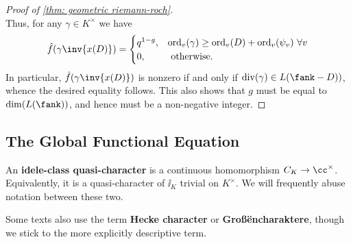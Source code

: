 \documentclass[11pt, x11names, openany]{book}
\begin{document}
\begin{proof}[Proof of \ref{thm: geometric riemann-roch}]
\begin{equation*}
\end{equation*}
Thus, for any $\gamma \in K^\times$ we have
\begin{equation*}
    \hat{f}(\gamma \inv{x(D)}) = \begin{cases}
    q^{1-g}, & \ord_v(\gamma) \geq \ord_v(D) + \ord_v(\psi_v) \ \forall v\\
    0, & \text{ otherwise}.
    \end{cases}
\end{equation*}
In particular, $\hat{f}(\gamma \inv{x(D)})$ is nonzero if and only if $\smalldiv(\gamma) \in L(\fank - D))$, whence the desired equality follows. This also shows that $g$ must be equal to $\dim(L(\fank))$, and hence must be a non-negative integer.
\end{proof}



\subsection{The Global Functional Equation}
\label{subsection: global zeta function}

\begin{defn}
\label{def: idele-class character}
An \textbf{idele-class quasi-character} is a continuous homomorphism $C_K \to \cc^\times$. Equivalently, it is a quasi-character of $\ii_K$ trivial on $K^\times$. We will frequently abuse notation between these two.
\end{defn}

\begin{remark}
Some texts also use the term \textbf{Hecke character} or \textbf{Gro\ss \"encharaktere}, though we stick to the more explicitly descriptive term.
\end{remark}
\end{document}

